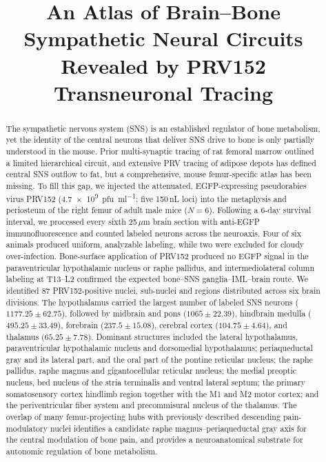\documentclass[11pt]{article}
\title{An Atlas of Brain--Bone Sympathetic Neural Circuits Revealed by PRV152 Transneuronal Tracing}
\author{}
\date{}
\begin{document}
\maketitle

\begin{abstract}
The sympathetic nervous system (SNS) is an established regulator of bone metabolism, yet the identity of the central neurons that deliver SNS drive to bone is only partially understood in the mouse. Prior multi-synaptic tracing of rat femoral marrow outlined a limited hierarchical circuit, and extensive PRV tracing of adipose depots has defined central SNS outflow to fat, but a comprehensive, mouse femur-specific atlas has been missing. To fill this gap, we injected the attenuated, EGFP-expressing pseudorabies virus PRV152 (\SI{4.7e9}{pfu\per\milli\litre}; five 150\,nL loci) into the metaphysis and periosteum of the right femur of adult male mice ($N=6$). Following a 6-day survival interval, we processed every sixth 25\,$\mu$m brain section with anti-EGFP immunofluorescence and counted labeled neurons across the neuroaxis. Four of six animals produced uniform, analyzable labeling, while two were excluded for cloudy over-infection. Bone-surface application of PRV152 produced no EGFP signal in the paraventricular hypothalamic nucleus or raphe pallidus, and intermediolateral column labeling at T13--L2 confirmed the expected bone--SNS ganglia--IML--brain route. We identified 87 PRV152-positive nuclei, sub-nuclei and regions distributed across six brain divisions. The hypothalamus carried the largest number of labeled SNS neurons ($1177.25 \pm 62.75$), followed by midbrain and pons ($1065 \pm 22.39$), hindbrain medulla ($495.25 \pm 33.49$), forebrain ($237.5 \pm 15.08$), cerebral cortex ($104.75 \pm 4.64$), and thalamus ($65.25 \pm 7.78$). Dominant structures included the lateral hypothalamus, paraventricular hypothalamic nucleus and dorsomedial hypothalamus; periaqueductal gray and its lateral part, and the oral part of the pontine reticular nucleus; the raphe pallidus, raphe magnus and gigantocellular reticular nucleus; the medial preoptic nucleus, bed nucleus of the stria terminalis and ventral lateral septum; the primary somatosensory cortex hindlimb region together with the M1 and M2 motor cortex; and the periventricular fiber system and precommisural nucleus of the thalamus. The overlap of many femur-projecting hubs with previously described descending pain-modulatory nuclei identifies a candidate raphe magnus--periaqueductal gray axis for the central modulation of bone pain, and provides a neuroanatomical substrate for autonomic regulation of bone metabolism.
\end{abstract}
\end{document}
